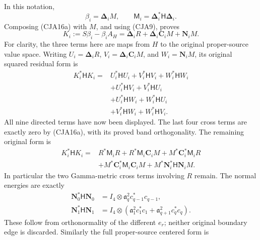 In this notation,
\[
 \beta_i=\boldsymbol\Delta_iM,\qquad
 \mathsf M_i=\boldsymbol\Delta_i^*\mathsf H\boldsymbol\Delta_i .
\]
Composing (CJA16a) with \(M\), and using (CJA9), proves
\begin{equation}
 K_i:=S\beta_i-\beta_iA_H
 =\boldsymbol\Delta_iR+
   \boldsymbol\Delta_i\boldsymbol C_iM+\boldsymbol N_iM.
 \tag{CJA17}
\end{equation}
For clarity, the three terms here are maps from \(H\) to the original
proper-source value space.
Writing
\(U_i=\boldsymbol\Delta_iR\),
\(V_i=\boldsymbol\Delta_i\boldsymbol C_iM\), and
\(W_i=\boldsymbol N_iM\), its original squared residual form is
\begin{equation}
 \begin{split}
 K_i^*\mathsf HK_i={}&
 U_i^*\mathsf HU_i+V_i^*\mathsf HV_i+W_i^*\mathsf HW_i\\
 &+U_i^*\mathsf HV_i+V_i^*\mathsf HU_i\\
 &+U_i^*\mathsf HW_i+W_i^*\mathsf HU_i\\
 &+V_i^*\mathsf HW_i+W_i^*\mathsf HV_i .
 \end{split}
 \tag{CJA18}
\end{equation}
All nine directed terms have now been displayed.  The last four
cross terms are exactly zero by (CJA16a), with its proved band
orthogonality.  The remaining original form is
\begin{equation}
 \begin{split}
 K_i^*\mathsf HK_i={}&R^*\mathsf M_iR
  +R^*\mathsf M_i\boldsymbol C_iM
  +M^*\boldsymbol C_i^*\mathsf M_iR\\
 &+M^*\boldsymbol C_i^*\mathsf M_i\boldsymbol C_iM
  +M^*\boldsymbol N_i^*\mathsf H\boldsymbol N_iM .
 \end{split}
 \tag{CJA18a}
\end{equation}
In particular the two Gamma-metric cross terms involving \(R\)
remain.  The normal energies are exactly
\begin{equation}
 \begin{split}
 \boldsymbol N_0^*\mathsf H\boldsymbol N_0
 &=I_4\otimes\mathfrak a_q^2c_{q-1}^*c_{q-1},\\
 \boldsymbol N_1^*\mathsf H\boldsymbol N_1
 &=I_4\otimes
  (\mathfrak a_1^2c_1^*c_1+
                  \mathfrak a_{q+1}^2c_q^*c_q).
 \end{split}
 \tag{CJA18b}
\end{equation}
These follow from orthonormality of the different \(e_r\);
neither original boundary edge is discarded.
Similarly the full proper-source centered form is
